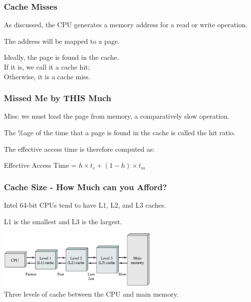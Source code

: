 \begin{frame}
\frametitle{Cache Misses}

As discussed, the CPU generates a memory address for a read or write operation.

The address will be mapped to a page. 

Ideally, the page is found in the cache.\\
\quad If it is, we call it a \alert{cache hit};\\
\quad Otherwise, it is a \alert{cache miss}.

\end{frame}



\begin{frame}
\frametitle{Missed Me by THIS Much}

Miss: we must load the page from memory, a comparatively slow operation.


The \%age of the time that a page is found in the cache is called the \alert{hit ratio}.

 The effective access time is therefore computed as:

\begin{center}
Effective Access Time = $h \times t_{c} + (1-h) \times t_{m}$
\end{center}

\end{frame}



\begin{frame}
\frametitle{Cache Size - How Much can you Afford?}

Intel 64-bit CPUs tend to have L1, L2, and L3 caches. 

L1 is the smallest and L3 is the largest.

\begin{center}
\includegraphics[width=0.6\textwidth]{images/caches.png}\\
Three levels of cache between the CPU and main memory.
\end{center}


\end{frame}



